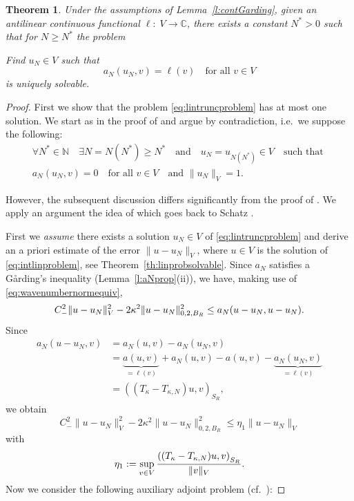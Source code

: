\documentclass[12pt,DIV=14]{scrartcl}
\newtheorem{theorem}[definition]{Theorem}
\providecommand{\C}{\mathbb{C}}
\providecommand{\N}{\mathbb{N}}
\let\Re\relax\DeclareMathOperator{\Re}{Re}
\begin{document}
\begin{theorem}\label{th:lintruncprobsolvable}
Under the assumptions of Lemma~\ref{l:contGarding},
given an antilinear continuous functional $\ell:\; V\to\C$, there exists a constant
$N^\ast > 0$ such that for $N \ge N^\ast$ the problem

Find $u_N\in V$ such that
\begin{equation}\label{eq:lintruncproblem}
a_N(u_N,v) = \ell(v)
\quad\text{for all } v\in V
\end{equation}
is uniquely solvable.
\end{theorem}
\begin{proof}
First we show that the problem \eqref{eq:lintruncproblem} has at most one solution.
We start as in the proof of \cite[Thm.~4.5]{Hsiao:11} and argue by contradiction,
i.e.\ we suppose the following:
\begin{equation}\label{eq:contrass}
\begin{gathered}
\forall N^\ast\in\N \quad \exists N = N(N^\ast) \ge N^\ast
\quad\text{and}\quad
u_N = u_{N(N^\ast)}\in V
\quad\text{such that }\\
a_N(u_N ,v) = 0
\quad\text{for all }
v\in V
\quad\text{and }
\|u_N\|_V = 1.
\end{gathered}
\end{equation}

However, the subsequent discussion differs significantly from the proof of \cite[Thm.~4.5]{Hsiao:11}.
We apply an argument the idea of which goes back to Schatz \cite{Schatz:74}.

First we \emph{assume} there exists a solution $u_N\in V$ of \eqref{eq:lintruncproblem}
and derive an a priori estimate of the error $\|u-u_N\|_V$, where $u\in V$ is the
solution of \eqref{eq:intlinproblem}, see Theorem~\ref{th:linprobsolvable}.
Since $a_N$ satisfies a G{\aa}rding's inequality (Lemma~\ref{l:aNprop}(ii)),
we have, making use of \eqref{eq:wavenumbernormequiv},
\[
C_-^2 \|u-u_N\|_V^2 - 2\kappa^2 \|u-u_N\|_{0,2,B_R}^2 \le \Re a_N(u-u_N,u-u_N).
\]
Since
\begin{align*}
a_N(u-u_N,v) &= a_N(u,v) - a_N(u_N,v)\\
&= \underbrace{a(u,v)}_{=\ell(v)} + a_N(u,v) - a(u,v) - \underbrace{a_N(u_N,v)}_{=\ell(v)}\\
&= \left((T_\kappa - T_{\kappa,N}) u,v\right)_{S_R},
\end{align*}
we obtain
\begin{equation}\label{eq:aprioriprim}
C_-^2 \|u-u_N\|_V^2 - 2\kappa^2 \|u-u_N\|_{0,2,B_R}^2
\le \eta_1 \|u-u_N\|_V
\end{equation}
with
\[
\eta_1 := \sup_{v\in V}\frac{\Re \left((T_\kappa - T_{\kappa,N}) u,v\right)_{S_R}}{\|v\|_V}.
\]
Now we consider the following auxiliary adjoint problem (cf.\ \cite[p.~43]{McLean:00}):


\end{proof}
\end{document}
